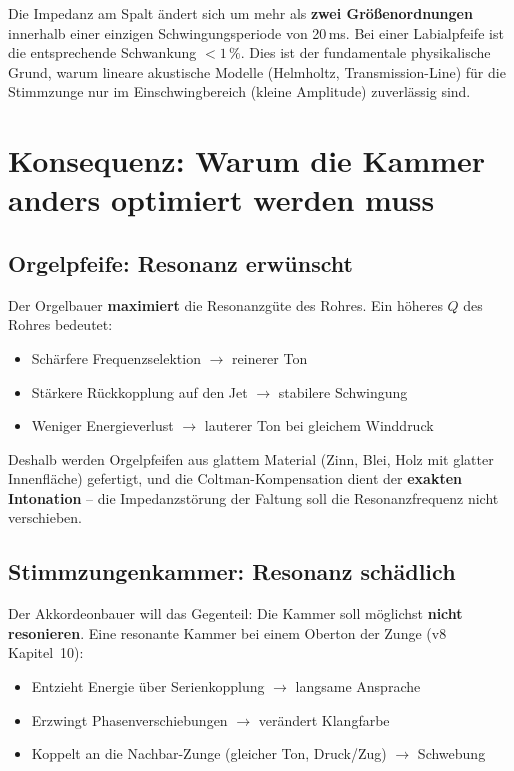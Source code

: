 \documentclass[11pt,a4paper]{article}
\begin{document}
\begin{warnbox}
Die Impedanz am Spalt ändert sich um mehr als \textbf{zwei Größenordnungen} innerhalb einer einzigen Schwingungsperiode von 20\,ms. Bei einer Labialpfeife ist die entsprechende Schwankung $< 1\,\%$. Dies ist der fundamentale physikalische Grund, warum lineare akustische Modelle (Helmholtz, Transmission-Line) für die Stimmzunge nur im Einschwingbereich (kleine Amplitude) zuverlässig sind.
\end{warnbox}

\section{Konsequenz: Warum die Kammer anders optimiert werden muss}

\subsection{Orgelpfeife: Resonanz erwünscht}

Der Orgelbauer \textbf{maximiert} die Resonanzgüte des Rohres. Ein höheres $Q$ des Rohres bedeutet:
\begin{itemize}[leftmargin=5mm, itemsep=1pt]
\item Schärfere Frequenzselektion $\to$ reinerer Ton
\item Stärkere Rückkopplung auf den Jet $\to$ stabilere Schwingung
\item Weniger Energieverlust $\to$ lauterer Ton bei gleichem Winddruck
\end{itemize}

Deshalb werden Orgelpfeifen aus glattem Material (Zinn, Blei, Holz mit glatter Innenfläche) gefertigt, und die Coltman-Kompensation dient der \textbf{exakten Intonation} -- die Impedanzstörung der Faltung soll die Resonanzfrequenz nicht verschieben.

\subsection{Stimmzungenkammer: Resonanz schädlich}

Der Akkordeonbauer will das Gegenteil: Die Kammer soll möglichst \textbf{nicht resonieren}. Eine resonante Kammer bei einem Oberton der Zunge (v8 Kapitel~10):
\begin{itemize}[leftmargin=5mm, itemsep=1pt]
\item Entzieht Energie über Serienkopplung $\to$ langsame Ansprache
\item Erzwingt Phasenverschiebungen $\to$ verändert Klangfarbe
\item Koppelt an die Nachbar-Zunge (gleicher Ton, Druck/Zug) $\to$ Schwebung
\end{itemize}
\end{document}
